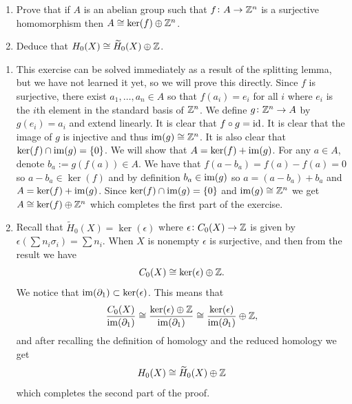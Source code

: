 \documentclass[11pt,a4paper]{article}
\begin{document}
\begin{exercise} \phantom{}
  \begin{enumerate}
  \item[(1)] Prove that if $A$ is an abelian group such that
    $f \colon A \to \mathbb{Z}^n$  is a surjective homomorphism
    then $A \cong \ker(f) \oplus \mathbb{Z}^n$.
  \item[(2)] Deduce that $H_0(X) \cong \widetilde{H}_0(X) \oplus \mathbb{Z}$.
  \end{enumerate}
\end{exercise}
\begin{solution} \phantom{}
\begin{enumerate}
  \item[(1)]
  This exercise can be solved immediately as a result of the splitting
  lemma, but we have not learned it yet, so we will prove this directly.
  Since $f$ is surjective, there exist $a_1,\dots,a_n \in A$
  so that $f(a_i) = e_i$ for all $i$ where $e_i$ is the $i$th
  element in the standard basis of $\mathbb{Z}^n$.
  We define $g \colon \mathbb{Z}^n \to A$ by $g(e_i) = a_i$ and extend linearly.
  It is clear that $f \circ g = \operatorname{id}$.
  It is clear that the image of $g$ is injective and thus
  $\operatorname{im}(g) \cong \mathbb{Z}^n$.
  It is also clear that $\ker(f) \cap \operatorname{im}(g) = \left\{0\right\}$.
  We will show that $A = \ker(f) + \operatorname{im}(g)$.
  For any $a \in A$, denote $b_a := g(f(a)) \in A$.
  We have that $f(a - b_a) = f(a) - f(a) = 0$
  so $a - b_a \in \ker(f)$ and by definition $b_a \in \operatorname{im}(g)$
  so $a = (a - b_a) + b_a$ and $A = \ker(f) + \operatorname{im}(g)$.
  Since $\ker(f) \cap \operatorname{im}(g) = \left\{0\right\}$ and $\operatorname{im}(g) \cong \mathbb{Z}^n$
  we get $A \cong \ker(f) \oplus \mathbb{Z}^n$ which completes the first
  part of the exercise.
  \item[(2)]
  Recall that $\widetilde{H}_0(X) = \ker(\epsilon)$
  where $\epsilon \colon C_0(X) \to \mathbb{Z}$ is given by
  $\epsilon(\sum n_i \sigma_i) = \sum n_i$.
  When $X$ is nonempty $\epsilon$ is surjective,
  and then from the result we have
  \[
    C_0(X) \cong \ker(\epsilon) \oplus \mathbb{Z}.
  \]
  We notice that $\operatorname{im}(\partial_1) \subset \ker(\epsilon)$.
  This means that
  \[
    \frac{C_0(X)}{\operatorname{im}(\partial_1)} \cong
    \frac{\ker(\epsilon) \oplus \mathbb{Z}}{\operatorname{im}(\partial_1)} \cong
    \frac{\ker(\epsilon)}{\operatorname{im}(\partial_1)} \oplus \mathbb{Z},
  \]
  and after recalling the definition of homology and the reduced homology
  we get
  \[
    H_0(X) \cong \widetilde{H}_0(X) \oplus \mathbb{Z}
  \]
  which completes the second part of the proof.
\end{enumerate}
\end{solution}
\end{document}
